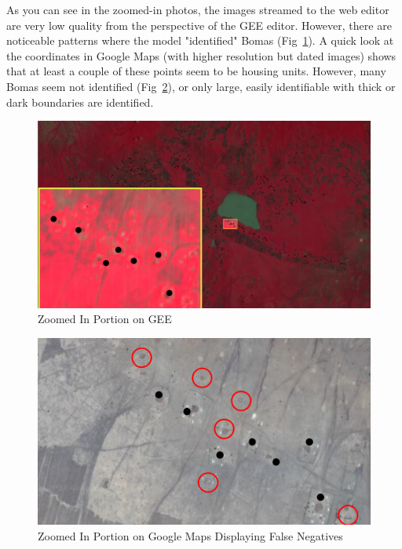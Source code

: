 \documentclass[10pt]{article}
\begin{document}
As you can see in the zoomed-in photos, the images streamed to the web editor are very low quality from the perspective of the GEE editor. However, there are noticeable patterns where the model "identified" Bomas (Fig~\ref{fig:Zoomed_Overlayed}). A quick look at the coordinates in Google Maps (with higher resolution but dated images) shows that at least a couple of these points seem to be housing units. However, many Bomas seem not identified (Fig~\ref{fig:zoomed_google_maps}), or only large, easily identifiable with thick or dark boundaries are identified.

\begin{figure} [H]
    \centering
    \includegraphics[width=1\linewidth]{images/zoomed in overlay.png}
    \caption{Zoomed In Portion on GEE}
    \label{fig:Zoomed_Overlayed}
\end{figure}

\begin{figure} [H]
    \centering
    \includegraphics[width=1\linewidth]{images/zoomed google maps highlighted.png}
    \caption{Zoomed In Portion on Google Maps Displaying False Negatives}
    \label{fig:zoomed_google_maps}
\end{figure}
\end{document}
